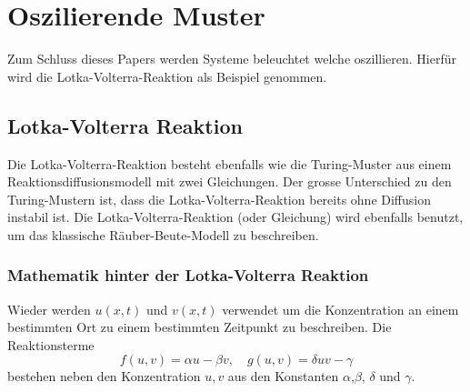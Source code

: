 %
%
%
%
\section{Oszilierende Muster
\label{reaktdiff:section:teil2}}
Zum Schluss dieses Papers werden Systeme beleuchtet welche oszillieren.
Hierfür wird die Lotka-Volterra-Reaktion als Beispiel genommen.


\subsection{Lotka-Volterra Reaktion 
\label{reaktdiff:subsection:bonorum}}

Die Lotka-Volterra-Reaktion \cite{Wikipedia_LotkaVolterra_2025}  besteht ebenfalls wie die Turing-Muster aus einem Reaktionsdiffusionsmodell mit zwei Gleichungen.
Der grosse Unterschied zu den Turing-Mustern ist, dass die Lotka-Volterra-Reaktion bereits ohne Diffusion instabil ist.
Die Lotka-Volterra-Reaktion (oder Gleichung) wird ebenfalls benutzt, um das klassische Räuber-Beute-Modell zu beschreiben.

\subsubsection{Mathematik hinter der Lotka-Volterra Reaktion}

Wieder werden \(u(x,t)\) und \(v(x,t)\) verwendet um die Konzentration an einem bestimmten Ort zu einem bestimmten Zeitpunkt zu beschreiben.
Die Reaktionsterme
\begin{equation}
     f(u,v) = \alpha u -  \beta v, \quad g(u,v)= \delta uv - \gamma
      \label{reaktdiff:equation:lvsys}
\end{equation}
bestehen neben den Konzentration \(u,v\) aus den Konstanten \(\alpha\),\(\beta\), \(\delta\) und \(\gamma\).

